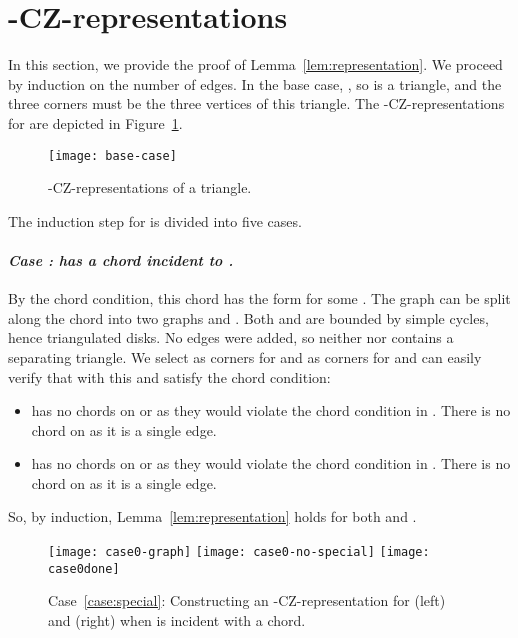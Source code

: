 \documentclass{article}
\renewcommand{\int}[1]{}
\newcounter{thecase} \setcounter{thecase}{0}
\newcommand{\case}[1]{\noindent
            \refstepcounter{thecase}\paragraph*{\textnormal{\textit{Case \arabic{thecase}: #1}}}
}
\begin{document}
\section{\int{F}-CZ-representations}
\label{sec:proof}

In this section, we provide the proof of Lemma~\ref{lem:representation}.
We proceed by induction on the number of edges. In the base case, , so
 is a triangle, and the three corners  must be the three vertices 
of this triangle.  The \int{F}-CZ-representations 
for 
are depicted in Figure~\ref{fig:base-case}.

\begin{figure}
	\centering
	\texttt{[image: base-case]}
	\caption{\int{F}-CZ-representations of a triangle.}
	\label{fig:base-case}
\end{figure}

The induction step for  is divided into five cases.

\case{ has a chord incident to .}  
\label{case:special}
By the chord condition, this chord has the form  for some .
The graph  can be split along the chord  into two graphs  and
.  Both  and  are bounded by simple cycles, hence triangulated
disks.  No edges were added, so neither  nor 
contains a separating triangle.   We select  as corners for 
and  as corners for  and can easily verify that with this
 and  satisfy the chord condition: 
\begin{itemize}
\item  has no chords on  or  as they would violate the chord condition in . 
There is no chord on  as it is a single edge.
\item  has no chords on  or  as they would violate the chord condition in . 
There is no chord on  as it is a single edge.
\end{itemize}

So, by induction, Lemma~\ref{lem:representation} holds for both  and .




\begin{figure}
\centering
\texttt{[image: case0-graph]}\hspace{4em}
\texttt{[image: case0-no-special]}\hspace{4em}
\texttt{[image: case0done]}
\caption{Case~\ref{case:special}: Constructing an 
\int{F}-CZ-representation for  (left) and  
(right) when  is incident with a chord.}
\label{fig:case0}
\end{figure}
\end{document}
